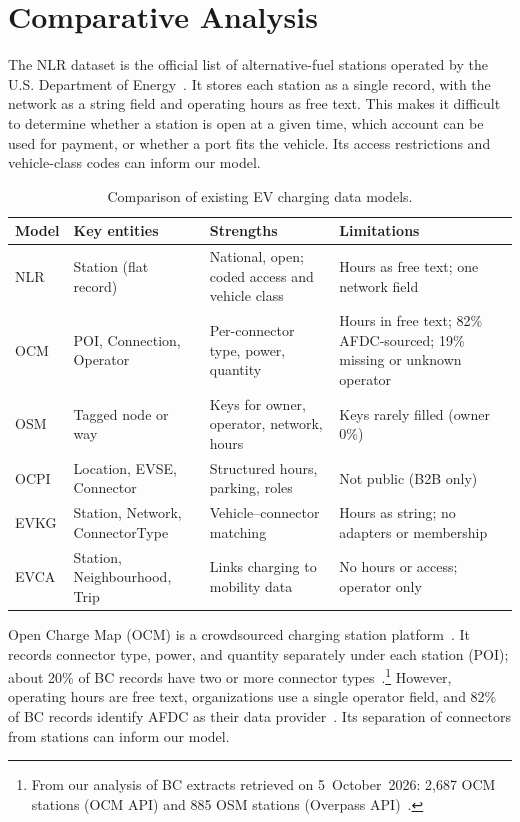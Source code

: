 \documentclass[sigconf]{acmart}
\begin{document}
\section{Comparative Analysis}

The NLR dataset is the official list of alternative-fuel stations operated by the U.S. Department of Energy~\cite{nlr}. It stores each station as a single record, with the network as a string field and operating hours as free text. This makes it difficult to determine whether a station is open at a given time, which account can be used for payment, or whether a port fits the vehicle. Its access restrictions and vehicle-class codes can inform our model.

\begin{table}[!ht]
  \centering
  \caption{Comparison of existing EV charging data models.}
  \label{tab:comparison}
  \scriptsize
  \setlength{\tabcolsep}{3pt}
  \renewcommand{\arraystretch}{1.1}
  \begin{tabularx}{\columnwidth}{@{}l
      >{\raggedright\arraybackslash}X
      >{\raggedright\arraybackslash}X
      >{\raggedright\arraybackslash}X@{}}
    \toprule
    \textbf{Model} & \textbf{Key entities} & \textbf{Strengths} & \textbf{Limitations} \\
    \midrule
    NLR & Station (flat record) & National, open; coded access and vehicle class & Hours as free text; one network field \\
    OCM & POI, Connection, Operator & Per-connector type, power, quantity & Hours in free text; 82\% AFDC-sourced; 19\% missing or unknown operator~\cite{ocm} \\
    OSM & Tagged node or way & Keys for owner, operator, network, hours & Keys rarely filled (owner 0\%)~\cite{osm_data} \\
    OCPI & Location, EVSE, Connector & Structured hours, parking, roles & Not public (B2B only) \\
    EVKG & Station, Network, ConnectorType & Vehicle--connector matching & Hours as string; no adapters or membership \\
    EVCA & Station, Neighbourhood, Trip & Links charging to mobility data & No hours or access; operator only \\
    \bottomrule
  \end{tabularx}
\end{table}
Open Charge Map (OCM) is a crowdsourced charging station platform~\cite{ocm}. It records connector type, power, and quantity separately under each station (POI); about 20\% of BC records have two or more connector types~\cite{ocm}.\footnote{From our analysis of BC extracts retrieved on 5~October~2026: 2,687 OCM stations (OCM API) and 885 OSM stations (Overpass API)~\cite{ocm,osm_data}.} However, operating hours are free text, organizations use a single operator field, and 82\% of BC records identify AFDC as their data provider~\cite{ocm}. Its separation of connectors from stations can inform our model.
\end{document}
